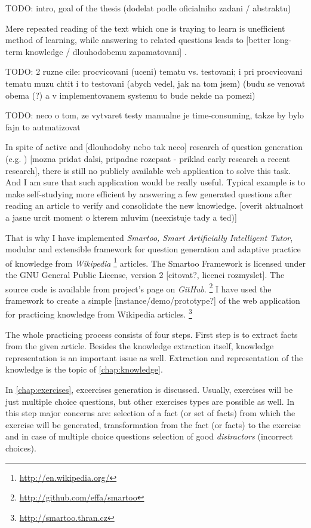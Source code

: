 \documentclass[a4paper, 12pt, twoside]{fithesis2}		%
\renewcommand{\_}{\leavevmode \kern0.0em\vbox{\hrule width0.4em}}
\newcounter{choice}
\begin{document}
TODO: intro, goal of the thesis (dodelat podle oficialniho zadani / abstraktu)

Mere repeated reading of the text which one is traying to learn is unefficient method of learning, while answering to related questions leads to [better long-term knowledge / dlouhodobemu zapamatovani] \parencite{edu-improve}.

TODO: 2 ruzne cile: procvicovani (uceni) tematu vs. testovani; i pri procvicovani tematu muzu chtit i to testovani (abych vedel, jak na tom jsem) (budu se venovat obema (?) a v implementovanem systemu to bude nekde na pomezi)

TODO: neco o tom, ze vytvaret testy manualne je time-consuming, takze by bylo fajn to autmatizovat

In spite of active and [dlouhodoby nebo tak neco] research of question generation
(e.g. \parencite{questions-wolfe, questions-eval}) [mozna pridat dalsi, pripadne rozepsat - priklad early research a recent research],
there is still no publicly available web application to solve this task.
And I am sure that such application would be really useful. Typical example is to make self-studying more efficient by answering a few generated questions after reading an article to verify and consolidate the new knowledge.
[overit aktualnost a jasne urcit moment o kterem mluvim (neexistuje tady a ted)]

That is why I have implemented \textit{Smartoo, Smart Artificially Intelligent Tutor}, modular and extensible framework for question generation and adaptive practice
of knowledge from \emph{Wikipedia}%
\footnote{\url{http://en.wikipedia.org/}}
articles.
The Smartoo Framework is licensed under the GNU General Public License, version 2 [citovat?, licenci rozmyslet].
The source code is available from project's page on \textit{GitHub}.%
\footnote{\url{http://github.com/effa/smartoo}}
I have used the framework to create a simple [instance/demo/prototype?] of the web application for practicing knowledge from Wikipedia articles.%
\footnote{\url{http://smartoo.thran.cz}}

The whole practicing process consists of four steps.
First step is to extract facts from the given article.
Besides the knowledge extraction itself, knowledge representation is an important issue as well.
Extraction and representation of the knowledge is the topic of \autoref{chap:knowledge}.

In \autoref{chap:exercises}, excercises generation is discussed.
Usually, exercises will be just multiple choice questions, but other exercises types are possible as well.
In this step major concerns are: selection of a fact (or set of facts) from which the exercise will be generated, transformation from the fact (or facts) to the exercise and in case of multiple choice questions selection of good \textit{distractors} (incorrect choices).
\end{document}
